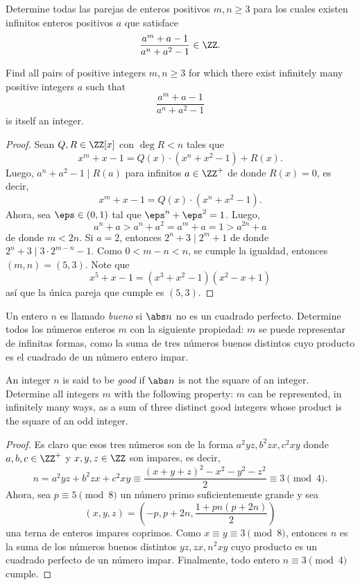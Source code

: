 \begin{probEG}[ISL 2002/N6]
  Determine todas las parejas de enteros positivos $m,n\ge 3$ para los cuales
  existen infinitos enteros positivos $a$ que satisface
  \[\frac{a^m+a-1}{a^n+a^2-1}\in\ZZ.\]
  \begin{hint}
    Find all pairs of positive integers $m,n\ge 3$ for which there exist
    infinitely many positive integers $a$ such that
    \[\frac{a^m+a-1}{a^n+a^2-1}\]
    is itself an integer.
  \end{hint}
\end{probEG}

\begin{proof}
  Sean $Q,R\in\ZZ[x]$ con $\deg R<n$ tales que
  \[x^m+x-1=Q(x)\cdot(x^n+x^2-1)+R(x).\]
  Luego, $a^n+a^2-1\mid R(a)$ para infinitos $a\in\ZZ^+$ de donde $R(x)=0$, es
  decir,
  \[x^m+x-1=Q(x)\cdot(x^n+x^2-1).\]
  Ahora, sea $\eps\in(0,1)$ tal que $\eps^n+\eps^2=1$. Luego,
  \[a^n+a>a^n+a^2=a^m+a=1>a^{2n}+a\]
  de donde $m<2n$. Si $a=2$, entonces $2^n+3\mid 2^m+1$ de donde
  $2^n+3\mid 3\cdot 2^{m-n}-1$. Como $0<m-n<n$, se cumple la igualdad, entonces
  $(m,n)=(5,3)$. Note que
  \[x^5+x-1=(x^3+x^2-1)(x^2-x+1)\]
  así que la única pareja que cumple es $(5,3)$.
\end{proof}

\begin{probMG}[ISL 2003/N5]
  Un entero $n$ es llamado \emph{bueno} si $\abs n$ no es un cuadrado perfecto.
  Determine todos los números enteros $m$ con la siguiente propiedad: $m$ se
  puede representar de infinitas formas, como la suma de tres números buenos
  distintos cuyo producto es el cuadrado de un número entero impar.
  \begin{hint}
    An integer $n$ is said to be \emph{good} if $\abs n$ is not the square of an
    integer. Determine all integers $m$ with the following property: $m$ can be
    represented, in infinitely many ways, as a sum of three distinct good
    integers whose product is the square of an odd integer.
  \end{hint}
\end{probMG}

\begin{proof}
  Es claro que esos tres números son de la forma $a^2yz,b^2zx,c^2xy$ donde
  $a,b,c\in\ZZ^+$ y $x,y,z\in\ZZ$ son impares, es decir,
  \[n=a^2yz+b^2zx+c^2xy\equiv\frac{(x+y+z)^2-x^2-y^2-z^2}{2}\equiv 3\pmod 4.\]
  Ahora, sea $p\equiv 5\pmod 8$ un número primo suficientemente grande y sea
  \[(x,y,z)=\left(-p,p+2n,\frac{1+pn(p+2n)}{2}\right)\]
  una terna de enteros impares coprimos. Como $x\equiv y\equiv 3\pmod 8$,
  entonces $n$ es la suma de los números buenos distintos $yz,zx,n^2xy$ cuyo
  producto es un cuadrado perfecto de un número impar. Finalmente, todo entero
  $n\equiv 3\pmod 4$ cumple.
\end{proof}

